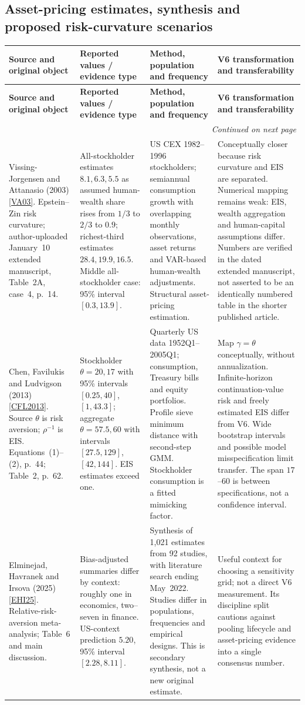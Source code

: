 \documentclass[10pt,a4paper,landscape]{article}
\makeatletter
\newcommand{\src}[1]{\hyperlink{ref:#1}{\textsf{[#1]}}}
\newenvironment{evidence}{%
\fontsize{9.4}{10.9}\selectfont\setlength{\parskip}{2pt}
\begin{longtable}{@{}P{\dimexpr .22\textwidth-7.5pt\relax}P{\dimexpr .24\textwidth-7.5pt\relax}P{\dimexpr .25\textwidth-7.5pt\relax}P{\dimexpr .29\textwidth-7.5pt\relax}@{}}
\toprule\rowcolor{tablehead}\textbf{Source and original object} & \textbf{Reported values / evidence type} & \textbf{Method, population and frequency} & \textbf{V6 transformation and transferability}\\\midrule
\endfirsthead
\toprule\rowcolor{tablehead}\textbf{Source and original object} & \textbf{Reported values / evidence type} & \textbf{Method, population and frequency} & \textbf{V6 transformation and transferability}\\\midrule
\endhead
\midrule\multicolumn{4}{r}{\footnotesize\itshape Continued on next page}\\\endfoot
\bottomrule\endlastfoot
}{\end{longtable}}
\makeatother
\begin{document}
\subsection{Asset-pricing estimates, synthesis and proposed risk-curvature scenarios}
\begin{evidence}
Vissing-Jorgensen and Attanasio (2003) \src{VA03}.
Epstein--Zin risk curvature; author-uploaded January~10 extended manuscript,
Table~2A, case~4, p.~14.
&
All-stockholder estimates $8.1,6.3,5.5$ as assumed human-wealth share rises
from $1/3$ to $2/3$ to $0.9$; richest-third estimates $28.4,19.9,16.5$.
Middle all-stockholder case: 95\% interval $[0.3,13.9]$.
&
US CEX 1982--1996 stockholders; semiannual consumption growth with overlapping
monthly observations, asset returns and VAR-based human-wealth adjustments.
Structural asset-pricing estimation.
&
Conceptually closer because risk curvature and EIS are separated. Numerical
mapping remains weak: EIS, wealth aggregation and human-capital assumptions
differ. Numbers are verified in the dated extended manuscript, not asserted
to be an identically numbered table in the shorter published article.
\\[5pt]
Chen, Favilukis and Ludvigson (2013) \src{CFL2013}.
Source $\theta$ is risk aversion; $\rho^{-1}$ is EIS.
Equations~(1)--(2), p.~44; Table~2, p.~62.
&
Stockholder $\theta=20,17$ with 95\% intervals $[0.25,40]$, $[1,43.3]$;
aggregate $\theta=57.5,60$ with intervals $[27.5,129]$, $[42,144]$.
EIS estimates exceed one.
&
Quarterly US data 1952Q1--2005Q1; consumption, Treasury bills and equity
portfolios. Profile sieve minimum distance with second-step GMM.
Stockholder consumption is a fitted mimicking factor.
&
Map $\gamma=\theta$ conceptually, without annualization. Infinite-horizon
continuation-value risk and freely estimated EIS differ from V6.
Wide bootstrap intervals and possible model misspecification limit transfer.
The span $17$--$60$ is between specifications, not a confidence interval.
\\[5pt]
Elminejad, Havranek and Irsova (2025) \src{EHI25}.
Relative-risk-aversion meta-analysis; Table~6 and main discussion.
&
Bias-adjusted summaries differ by context: roughly one in economics,
two--seven in finance. US-context prediction $5.20$, 95\% interval
$[2.28,8.11]$.
&
Synthesis of 1,021 estimates from 92 studies, with literature search ending
May~2022. Studies differ in populations, frequencies and empirical designs.
This is secondary synthesis, not a new original estimate.
&
Useful context for choosing a sensitivity grid; not a direct V6 measurement.
Its discipline split cautions against pooling lifecycle and asset-pricing
evidence into a single consensus number.
\\[5pt]
\end{evidence}
\end{document}

